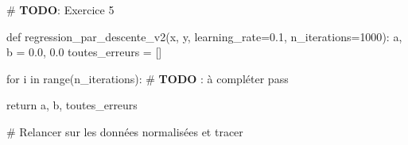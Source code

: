 \documentclass[
  french,
  11pt,
  a4paper,
]{scrbook}
\newenvironment{Shaded}{}{}
\newcommand{\AlertTok}[1]{\textcolor[rgb]{1.00,0.33,0.33}{\textbf{#1}}}
\newcommand{\BuiltInTok}[1]{\textcolor[rgb]{0.84,0.23,0.29}{#1}}
\newcommand{\CommentTok}[1]{\textcolor[rgb]{0.42,0.45,0.49}{#1}}
\newcommand{\ControlFlowTok}[1]{\textcolor[rgb]{0.84,0.23,0.29}{#1}}
\newcommand{\DecValTok}[1]{\textcolor[rgb]{0.00,0.36,0.77}{#1}}
\newcommand{\FloatTok}[1]{\textcolor[rgb]{0.00,0.36,0.77}{#1}}
\newcommand{\KeywordTok}[1]{\textcolor[rgb]{0.84,0.23,0.29}{#1}}
\newcommand{\NormalTok}[1]{\textcolor[rgb]{0.14,0.16,0.18}{#1}}
\newcommand{\OperatorTok}[1]{\textcolor[rgb]{0.14,0.16,0.18}{#1}}
\begin{document}
\begin{Shaded}
\begin{Highlighting}[]
\CommentTok{\# }\AlertTok{TODO}\CommentTok{: Exercice 5}

\KeywordTok{def}\NormalTok{ regression\_par\_descente\_v2(x, y, learning\_rate}\OperatorTok{=}\FloatTok{0.1}\NormalTok{, n\_iterations}\OperatorTok{=}\DecValTok{1000}\NormalTok{):}
\NormalTok{    a, b }\OperatorTok{=} \FloatTok{0.0}\NormalTok{, }\FloatTok{0.0}
\NormalTok{    toutes\_erreurs }\OperatorTok{=}\NormalTok{ []}
    
    \ControlFlowTok{for}\NormalTok{ i }\KeywordTok{in} \BuiltInTok{range}\NormalTok{(n\_iterations):}
        \CommentTok{\# }\AlertTok{TODO}\CommentTok{ : à compléter}
        \ControlFlowTok{pass}
    
    \ControlFlowTok{return}\NormalTok{ a, b, toutes\_erreurs}


\CommentTok{\# Relancer sur les données normalisées et tracer}
\end{Highlighting}
\end{Shaded}
\end{document}
